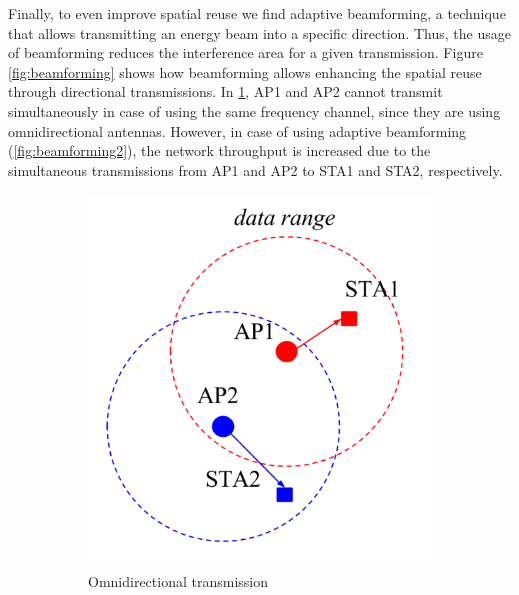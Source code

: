 \documentclass[12pt, a4paper,twoside]{tesi_upf}
\begin{document}
			Finally, to even improve spatial reuse we find adaptive beamforming, a technique that allows transmitting an energy beam into a specific direction. Thus, the usage of beamforming reduces the interference area for a given transmission. Figure \ref{fig:beamforming} shows how beamforming allows enhancing the spatial reuse through directional transmissions. In \ref{fig:beamforming1}, AP1 and AP2 cannot transmit simultaneously in case of using the same frequency channel, since they are using omnidirectional antennas. However, in case of using adaptive beamforming (\ref{fig:beamforming2}), the network throughput is increased due to the simultaneous transmissions from AP1 and AP2 to STA1 and STA2, respectively.
			\begin{figure}[t!]
				\centering
				\begin{subfigure}[b]{0.4\textwidth}
					\includegraphics[width=\textwidth]{images/beamforming1}
					\caption{Omnidirectional transmission}
					\label{fig:beamforming1}
				\end{subfigure}
				\begin{subfigure}[b]{0.31\textwidth}

\end{subfigure}
\end{figure}
\end{document}
